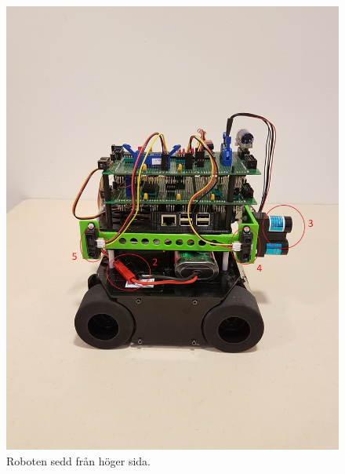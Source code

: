 \documentclass{article}
\begin{document}
\begin{figure}[H]
\centering
\includegraphics[scale=0.1]{robot_right_side}
\caption{Roboten sedd från höger sida.}
\label{fig:robot_right_side}
\end{figure}
\end{document}
